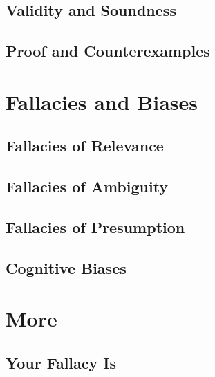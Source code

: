 \documentclass[justified]{tufte-book}
\begin{document}
\hypertarget{validity-and-soundness}{%
\section{Validity and Soundness}\label{validity-and-soundness}}

\hypertarget{proof-and-counterexamples}{%
\section{Proof and Counterexamples}\label{proof-and-counterexamples}}

\hypertarget{fallacies-and-biases}{%
\chapter{Fallacies and Biases}\label{fallacies-and-biases}}

\hypertarget{fallacies-of-relevance}{%
\section{Fallacies of Relevance}\label{fallacies-of-relevance}}

\hypertarget{fallacies-of-ambiguity}{%
\section{Fallacies of Ambiguity}\label{fallacies-of-ambiguity}}

\hypertarget{fallacies-of-presumption}{%
\section{Fallacies of Presumption}\label{fallacies-of-presumption}}

\hypertarget{cognitive-biases}{%
\section{Cognitive Biases}\label{cognitive-biases}}

\hypertarget{more}{%
\chapter*{More}\label{more}}

\hypertarget{your-fallacy-is}{%
\section{Your Fallacy Is}\label{your-fallacy-is}}
\end{document}
